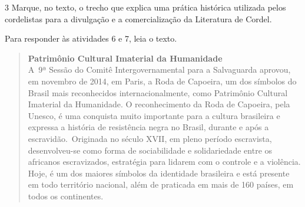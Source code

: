 \begin{escolha}

\num{3} Marque, no texto, o trecho que explica uma prática histórica utilizada
  pelos cordelistas para a divulgação e a comercialização da Literatura
  de Cordel.


Para responder às atividades 6 e 7, leia o texto.


\begin{quote}
\textbf{Patrimônio Cultural Imaterial da Humanidade}\\
 A~9ª Sessão do
Comitê Intergovernamental para a Salvaguarda aprovou, em novembro de
2014, em Paris, a Roda de Capoeira, um dos símbolos do Brasil mais
reconhecidos internacionalmente, como Patrimônio Cultural Imaterial da
Humanidade. O reconhecimento da Roda de Capoeira, pela Unesco, é uma
conquista muito importante para a cultura brasileira e expressa a
história de resistência negra no Brasil, durante e após a
escravidão.~Originada no século XVII, em pleno período escravista,
desenvolveu-se como forma de sociabilidade e solidariedade entre os
africanos escravizados, estratégia para lidarem com o controle e a
violência. Hoje, é um dos maiores símbolos da identidade brasileira e
está presente em todo território nacional, além de praticada em mais de
160 países, em todos os continentes.


\end{quote}
\end{escolha}
